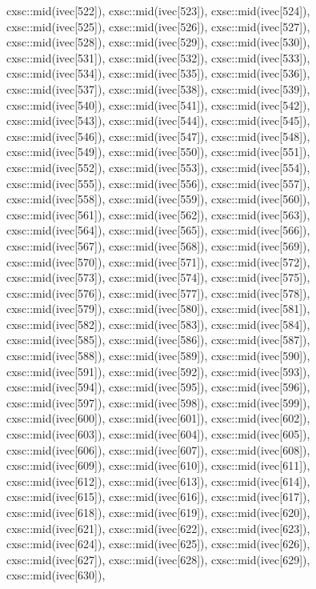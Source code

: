 \begin{DoxyCode}
{  cxsc::mid(ivec[522]),
  cxsc::mid(ivec[523]),
  cxsc::mid(ivec[524]),
  cxsc::mid(ivec[525]),
  cxsc::mid(ivec[526]),
  cxsc::mid(ivec[527]),
  cxsc::mid(ivec[528]),
  cxsc::mid(ivec[529]),
  cxsc::mid(ivec[530]),
  cxsc::mid(ivec[531]),
  cxsc::mid(ivec[532]),
  cxsc::mid(ivec[533]),
  cxsc::mid(ivec[534]),
  cxsc::mid(ivec[535]),
  cxsc::mid(ivec[536]),
  cxsc::mid(ivec[537]),
  cxsc::mid(ivec[538]),
  cxsc::mid(ivec[539]),
  cxsc::mid(ivec[540]),
  cxsc::mid(ivec[541]),
  cxsc::mid(ivec[542]),
  cxsc::mid(ivec[543]),
  cxsc::mid(ivec[544]),
  cxsc::mid(ivec[545]),
  cxsc::mid(ivec[546]),
  cxsc::mid(ivec[547]),
  cxsc::mid(ivec[548]),
  cxsc::mid(ivec[549]),
  cxsc::mid(ivec[550]),
  cxsc::mid(ivec[551]),
  cxsc::mid(ivec[552]),
  cxsc::mid(ivec[553]),
  cxsc::mid(ivec[554]),
  cxsc::mid(ivec[555]),
  cxsc::mid(ivec[556]),
  cxsc::mid(ivec[557]),
  cxsc::mid(ivec[558]),
  cxsc::mid(ivec[559]),
  cxsc::mid(ivec[560]),
  cxsc::mid(ivec[561]),
  cxsc::mid(ivec[562]),
  cxsc::mid(ivec[563]),
  cxsc::mid(ivec[564]),
  cxsc::mid(ivec[565]),
  cxsc::mid(ivec[566]),
  cxsc::mid(ivec[567]),
  cxsc::mid(ivec[568]),
  cxsc::mid(ivec[569]),
  cxsc::mid(ivec[570]),
  cxsc::mid(ivec[571]),
  cxsc::mid(ivec[572]),
  cxsc::mid(ivec[573]),
  cxsc::mid(ivec[574]),
  cxsc::mid(ivec[575]),
  cxsc::mid(ivec[576]),
  cxsc::mid(ivec[577]),
  cxsc::mid(ivec[578]),
  cxsc::mid(ivec[579]),
  cxsc::mid(ivec[580]),
  cxsc::mid(ivec[581]),
  cxsc::mid(ivec[582]),
  cxsc::mid(ivec[583]),
  cxsc::mid(ivec[584]),
  cxsc::mid(ivec[585]),
  cxsc::mid(ivec[586]),
  cxsc::mid(ivec[587]),
  cxsc::mid(ivec[588]),
  cxsc::mid(ivec[589]),
  cxsc::mid(ivec[590]),
  cxsc::mid(ivec[591]),
  cxsc::mid(ivec[592]),
  cxsc::mid(ivec[593]),
  cxsc::mid(ivec[594]),
  cxsc::mid(ivec[595]),
  cxsc::mid(ivec[596]),
  cxsc::mid(ivec[597]),
  cxsc::mid(ivec[598]),
  cxsc::mid(ivec[599]),
  cxsc::mid(ivec[600]),
  cxsc::mid(ivec[601]),
  cxsc::mid(ivec[602]),
  cxsc::mid(ivec[603]),
  cxsc::mid(ivec[604]),
  cxsc::mid(ivec[605]),
  cxsc::mid(ivec[606]),
  cxsc::mid(ivec[607]),
  cxsc::mid(ivec[608]),
  cxsc::mid(ivec[609]),
  cxsc::mid(ivec[610]),
  cxsc::mid(ivec[611]),
  cxsc::mid(ivec[612]),
  cxsc::mid(ivec[613]),
  cxsc::mid(ivec[614]),
  cxsc::mid(ivec[615]),
  cxsc::mid(ivec[616]),
  cxsc::mid(ivec[617]),
  cxsc::mid(ivec[618]),
  cxsc::mid(ivec[619]),
  cxsc::mid(ivec[620]),
  cxsc::mid(ivec[621]),
  cxsc::mid(ivec[622]),
  cxsc::mid(ivec[623]),
  cxsc::mid(ivec[624]),
  cxsc::mid(ivec[625]),
  cxsc::mid(ivec[626]),
  cxsc::mid(ivec[627]),
  cxsc::mid(ivec[628]),
  cxsc::mid(ivec[629]),
  cxsc::mid(ivec[630]),
}
\end{DoxyCode}
